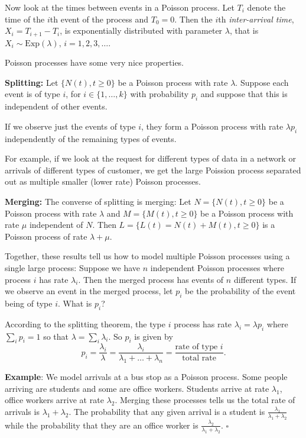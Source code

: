 \documentclass[11pt]{article}
\begin{document}
Now look at the  times between events in a Poisson process. Let $T_i$ denote the time of the $i$th event of the process and $T_0 = 0$.  Then the $i$th {\em inter-arrival time}, $X_i = T_{i+1} - T_{i} $, is exponentially distributed with parameter $\lambda$, that is $X_i \sim \mbox{Exp}(\lambda), \, i = 1,2,3,\ldots$.
 
 
Poisson processes have some very nice properties.  

{\bf Splitting:} Let $\{N(t),t \geq 0\}$ be a Poisson process with rate $\lambda$. Suppose each event is of type $i$, for $i \in \{1,\ldots,k\}$ with probability $p_i$ and suppose that this is independent of other events.

If we observe just the events of type $i$, they form a Poisson process with rate $\lambda p_i$ independently of the remaining types of events.

For example, if we look at the request for different types of data in a network or arrivals of different types of customer, we get the large Poission process separated out as multiple smaller (lower rate) Poisson processes.


{\bf Merging:} The converse of splitting is merging:   Let $N = \{N(t),t \geq 0\}$ be a Poisson process with rate $\lambda$ and $M = \{M(t),t \geq 0\}$ be a Poisson process with rate $\mu$ independent of $N$.
Then $L = \{L(t) = N (t) + M (t), t \geq 0\}$ is a Poisson process of rate $\lambda + \mu$.



Together, these results tell us how to model multiple Poisson processes using a single large process:  Suppose we have $n$ independent Poisson processes where process $i$ has rate $\lambda_i$.  Then the  merged process has events of $n$ different types. If we observe an event in the merged process, let $p_i$ be the probability of the event being of type $i$.  What is $p_i$?   

According to the splitting theorem, the type $i$ process has rate $\lambda_i = \lambda p_i$ where $\sum_i p_i = 1$ so that $\lambda = \sum_i \lambda_i$. So $p_i$ is given by
\[ p_i = \frac{\lambda_i}{\lambda} = \frac{\lambda_i}{\lambda_1 + \ldots + \lambda_n} = \frac{\mbox{rate of type }i}{\mbox{total rate}}.\]

{\bf Example}: We model arrivals at a bus stop as a Poisson process.  Some people arriving are students and some are office workers.  Students arrive at rate $\lambda_1$, office workers arrive at rate $\lambda_2$.  Merging these processes tells us the total rate of arrivals is $\lambda_1+\lambda_2$.  The probability that any given   arrival is a student is $\frac{\lambda_1}{\lambda_1+\lambda_2}$ while the probability that they are an office worker is $\frac{\lambda_2}{\lambda_1+\lambda_2}$. \hfill $\square$
\end{document}
